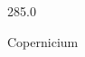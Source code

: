 \documentclass[12pt]{article}
\begin{document}
\hfill{}
\vfill
\begin{center}
  {\fontsize{50}{60}
  }

  285.0

Copernicium
\end{center}
\vfill
\end{document}
